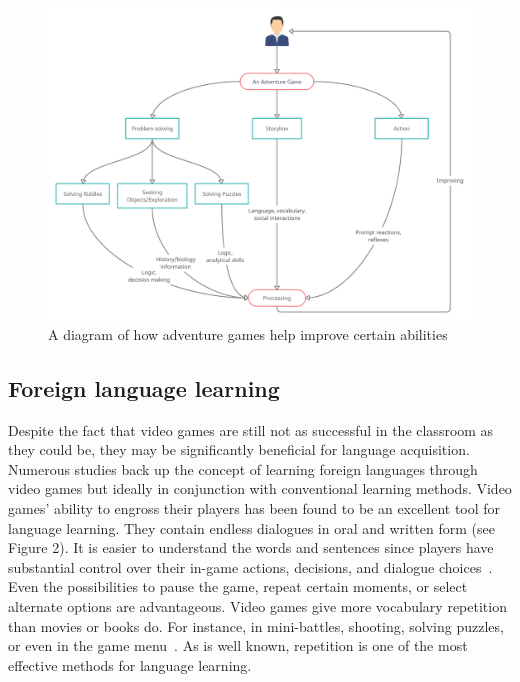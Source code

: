 \documentclass[10pt,twoside,english,a4paper]{article}
\begin{document}
\begin{figure}[h]
\centering
\includegraphics[scale=0.27]{adventure}
\caption{A diagram of how adventure games help improve certain abilities}
\end{figure}

\subsection{Foreign language learning} \label{language learning}
Despite the fact that video games are still not as successful in the classroom as they could be, they may be significantly beneficial for language acquisition. Numerous studies back up the concept of learning foreign languages through video games but ideally in conjunction with conventional learning methods. Video games' ability to engross their players has been found to be an excellent tool for language learning. They contain endless dialogues in oral and written form (see Figure 2). It is easier to understand the words and sentences since players have substantial control over their in-game actions, decisions, and dialogue choices~\cite{language}. Even the possibilities to pause the game, repeat certain moments, or select alternate options are advantageous. Video games give more vocabulary repetition than movies or books do. For instance, in mini-battles, shooting, solving puzzles, or even in the game menu~\cite{language}. As is well known, repetition is one of the most effective methods for language learning.
\end{document}
